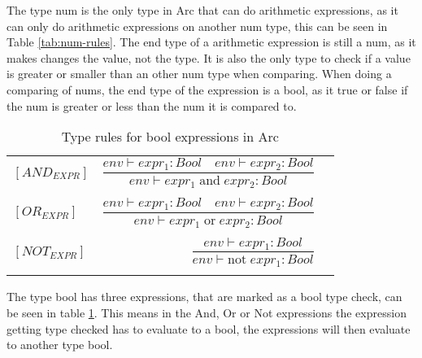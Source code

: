 The type num is the only type in Arc that can do arithmetic expressions, as it can only do arithmetic expressions on another num type, this can be seen in Table \ref*{tab:num-rules}. The end type of a arithmetic expression is still a num, as it makes changes the value, not the type. It is also the only type to check if a value is greater or smaller than an other num type when comparing. When doing a comparing of nums, the end type of the expression is a bool, as it true or false if the num is greater or less than the num it is compared to.

\begin{table}[htb!]
    \centering
    \begin{tabular}{lr>{\raggedright\arraybackslash}p{6cm}}
    $[AND_{EXPR}] $        & $\dfrac
        {env\vdash expr_1: Bool \quad env\vdash expr_2: Bool}
        {env\vdash expr_1 \;\text{and} \;expr_2: Bool}$
    \\
    \\
    $[OR_{EXPR}] $         & $\dfrac
        {env\vdash expr_1: Bool \quad env\vdash expr_2: Bool}
        {env\vdash expr_1 \;\text{or} \;expr_2: Bool}$
    \\
    \\
    $[NOT_{EXPR}] $        & $\dfrac
        {env\vdash expr_1: Bool}
        {env\vdash \text{not} \; expr_1 : Bool}$
    \\
    \\
    \end{tabular}
    \caption{Type rules for bool expressions in Arc}
    \label{tab:bool-rules}
\end{table}

The type bool has three expressions, that are marked as a bool type check, can be seen in table \ref*{tab:bool-rules}. This means in the And, Or or Not expressions the expression getting type checked has to evaluate to a bool, the expressions will then evaluate to another type bool. 

